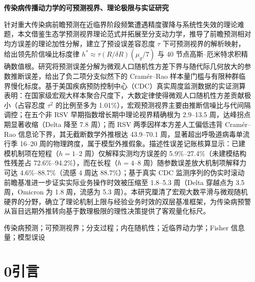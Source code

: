 \documentclass[11pt,a4paper]{article}
\theoremstyle{plain}
\theoremstyle{definition}
\begin{document}
\begin{center}
    \vspace*{0.5em}
    {\heiti\bfseries 传染病传播动力学的可预测视界、理论极限与实证研究} \\[1.8em]
\end{center}

针对重大传染病前瞻预测在近临界阶段频繁遭遇精度骤降与系统性失效的理论难题，本文借鉴生态学预测视界理论范式并拓展至分支动力学，推导了前瞻预测相对均方误差的理论加性分解，建立了预设误差容忍度 $\tau$ 下可预测视界的解析映射，给出领先阶信噪比标度律 $h^* \approx \tau (R/\delta R)(\mu_g/7)$ 与 40 节点高斯--厄米特求积精确数值根。研究将预测误差分解为微观人口随机性方差下界与随代际几何放大的参数推断误差，给出了负二项分支似然下的 Cram\'er--Rao 样本量门槛与有限种群临界慢化标度。基于美国疾病预防控制中心（CDC）真实周度监测数据的实证测算表明：在国家级宏观大样本聚合尺度下，大数定律使得微观人口随机性方差贡献极小（占容忍度 $\tau^2$ 的比例至多为 1.01\%），宏观预测视界主要由推断信噪比与代间隔调控；在五个非 RSV 早期指数增长期中理论视界精确根为 2.9--13.5 周，达峰拐点期显著收缩（Delta 降至 7.8 周）；而 RSV 两季因样本方差人工偏低违背 Cram\'er--Rao 信息论下界，其无截断数学外推根达 43.9--70.1 周，显著超出呼吸道病毒单流行季 16--20 周的物理跨度，属于模型外推假象。描述性误差记账核算显示：已建模机制项在短程（$h=1\text{--}2$ 周）仅解释实测均方误差的 5.9\%--27.4\%（未建模结构性残差占 72.6\%--94.2\%），而在长程（$h=4\text{--}8$ 周）随参数误差放大机制项解释力可达 4.6\%--88.7\%（流感 4 周达 88.7\%）；基于真实 CDC 监测序列的伪实时滚动前瞻基准进一步证实实际业务操作时效被压缩至 1.8--5.3 周（Delta 穿越点为 3.5 周，Omicron 为 1.8 周，流感为 5.3 周）。本研究厘清了宏观大数平滑与微观随机硬界的分野，确立了理论机制上限与经验业务时效的双层基准框架，为传染病预警从盲目远期外推转向基于数理极限的理性决策提供了客观量化标尺。

\vspace{0.8em}
传染病预测；可预测视界；分支过程；内在随机性；近临界动力学；Fisher 信息量；模型误设

\vspace{1.5em}


\section*{0\quad 引言}
\end{document}
